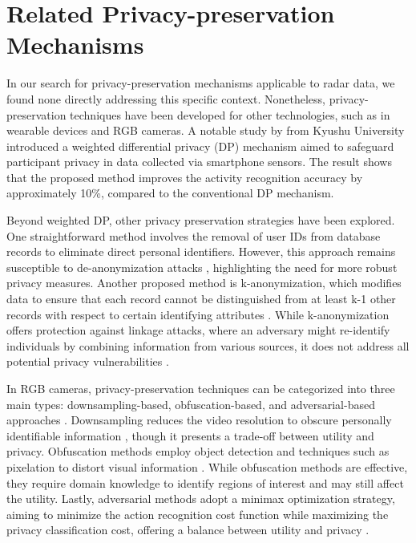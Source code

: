 \documentclass{l4proj}
\begin{document}
\section{Related Privacy-preservation Mechanisms}
In our search for privacy-preservation mechanisms applicable to radar data, we found none directly addressing this specific context. Nonetheless, privacy-preservation techniques have been developed for other technologies, such as in wearable devices and RGB cameras. A notable study by \cite{differential_privacy_with_weighted_privacy_preservation} from Kyushu University introduced a weighted differential privacy (DP) mechanism aimed to safeguard participant privacy in data collected via smartphone sensors. The result shows that the proposed method improves the activity recognition accuracy by approximately 10\%, compared to the conventional DP mechanism.

Beyond weighted DP, other privacy preservation strategies have been explored. One straightforward method involves the removal of user IDs from database records to eliminate direct personal identifiers. However, this approach remains susceptible to de-anonymization attacks \citep{de-anonymization_attacks}, highlighting the need for more robust privacy measures. Another proposed method is k-anonymization, which modifies data to ensure that each record cannot be distinguished from at least k-1 other records with respect to certain identifying attributes \citep{privacy-preserving_k-anonymity1, privacy-preserving_k-anonymity2}. While k-anonymization offers protection against linkage attacks, where an adversary might re-identify individuals by combining information from various sources, it does not address all potential privacy vulnerabilities \citep{privacy-preserving_trajectory}.

In RGB cameras, privacy-preservation techniques can be categorized into three main types: downsampling-based, obfuscation-based, and adversarial-based approaches \citep{self-supervised_privacy_preservation_action_recognition}. Downsampling reduces the video resolution to obscure personally identifiable information \citep{privacy-preservation_using_low_resolution_depth_images, towards_privacy_recognition, privacy_preserving_for_extreme_low_resolution}, though it presents a trade-off between utility and privacy. Obfuscation methods employ object detection and techniques such as pixelation to distort visual information \citep{personal_privacy_protection_face_tracking, learn_anonymize_face_privacy}. While obfuscation methods are effective, they require domain knowledge to identify regions of interest and may still affect the utility. Lastly, adversarial methods adopt a minimax optimization strategy, aiming to minimize the action recognition cost function while maximizing the privacy classification cost, offering a balance between utility and privacy \citep{privacy_preserving_adversarial_framework, visual_recognition_via_adversarial_training}.
\end{document}
